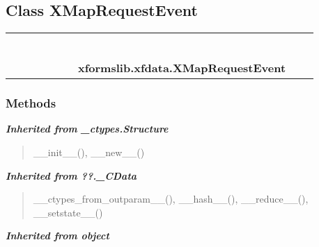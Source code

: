 \subsection{Class XMapRequestEvent}

    \label{xformslib:xfdata:XMapRequestEvent}
\begin{tabular}{cccccccccc}
\multicolumn{2}{r}{\settowidth{\BCL}{object}\multirow{2}{\BCL}{object}}
&&
&&
&&
  \\\cline{3-3}
  &&\multicolumn{1}{c|}{}
&&
&&
&&
  \\
\multicolumn{4}{r}{\settowidth{\BCL}{??.\_CData}\multirow{2}{\BCL}{??.\_CData}}
&&
&&
  \\\cline{5-5}
  &&&&\multicolumn{1}{c|}{}
&&
&&
  \\
\multicolumn{6}{r}{\settowidth{\BCL}{\_ctypes.Structure}\multirow{2}{\BCL}{\_ctypes.Structure}}
&&
  \\\cline{7-7}
  &&&&&&\multicolumn{1}{c|}{}
&&
  \\
&&&&&&\multicolumn{2}{l}{\textbf{xformslib.xfdata.XMapRequestEvent}}
\end{tabular}



  \subsubsection{Methods}


\large{\textbf{\textit{Inherited from \_ctypes.Structure}}}

\begin{quote}
\_\_init\_\_(), \_\_new\_\_()
\end{quote}

\large{\textbf{\textit{Inherited from ??.\_CData}}}

\begin{quote}
\_\_ctypes\_from\_outparam\_\_(), \_\_hash\_\_(), \_\_reduce\_\_(), \_\_setstate\_\_()
\end{quote}

\large{\textbf{\textit{Inherited from object}}}


